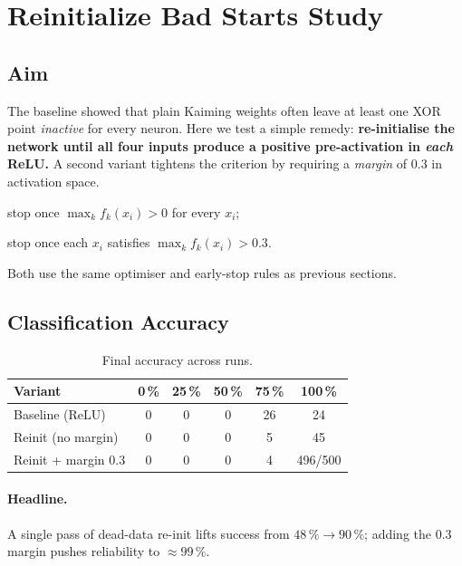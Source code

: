 \section{Reinitialize Bad Starts Study}
\label{sec:relu1-reinit}

\subsection*{Aim}
The baseline showed that plain Kaiming weights often leave at least one
XOR point \emph{inactive} for every neuron.  
Here we test a simple remedy: \textbf{re-initialise the network until all
four inputs produce a positive pre-activation in \emph{each} ReLU.}
A second variant tightens the criterion by requiring a \emph{margin}
of $0.3$ in activation space.

\begin{description}[leftmargin=2em,style=sameline]
  \item[\texttt{relu1\_reinit}]   stop once \(\max_k f_k(x_i) > 0\) for every \(x_i\);
  \item[\texttt{relu1\_reinit\_margin}] stop once each \(x_i\) satisfies
        \(\max_k f_k(x_i) > 0.3\).
\end{description}
Both use the same optimiser and early-stop rules as previous sections.

\subsection*{Classification Accuracy}

\begin{table}[h]
\centering
\caption{Final accuracy across runs.}
\label{tab:relu1-reinit-accuracy}
\begin{tabular}{lccccc}
\toprule
Variant & 0\,\% & 25\,\% & 50\,\% & 75\,\% & 100\,\% \\
\midrule
Baseline (ReLU)       & 0 & 0 & 0 & 26 & 24 \\
Reinit (no margin)    & 0 & 0 & 0 & 5  & 45 \\
Reinit + margin 0.3   & 0 & 0 & 0 & 4  & 496/500 \\
\bottomrule
\end{tabular}
\end{table}

\paragraph{Headline.}
A single pass of dead-data re-init lifts success from
$48\,\%\!\to\!90\,\%$;
adding the $0.3$ margin pushes reliability to \(\approx99\,\%\).

